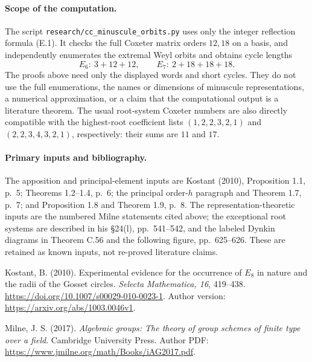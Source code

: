 \paragraph{Scope of the computation.}
The script \texttt{research/cc\_minuscule\_orbits.py} uses only
the integer reflection formula (E.1). It checks the full Coxeter
matrix orders \(12,18\) on a basis, and independently enumerates
the extremal Weyl orbits and obtains cycle lengths
\[
                  E_6:\ 3+12+12,\qquad
                  E_7:\ 2+18+18+18.
\]
The proofs above need only the displayed words and short cycles.
They do not use the full enumerations, the names or dimensions
of minuscule representations, a numerical approximation, or a
claim that the computational output is a literature theorem.
The usual root-system Coxeter numbers are also directly compatible
with the highest-root coefficient lists
\((1,2,2,3,2,1)\) and \((2,2,3,4,3,2,1)\), respectively:
their sums are \(11\) and \(17\).

\paragraph{Primary inputs and bibliography.}
The apposition and principal-element inputs are Kostant (2010),
Proposition 1.1, p.~5; Theorems 1.2--1.4, p.~6; the principal
order-\(h\) paragraph and Theorem 1.7, p.~7; and
Proposition 1.8 and Theorem 1.9, p.~8.
The representation-theoretic inputs are the numbered Milne
statements cited above; the exceptional root systems are described
in his \S24(l), pp.~541--542, and the labeled Dynkin diagrams in
Theorem C.56 and the following figure, pp.~625--626. These are retained as known
inputs, not re-proved literature claims.

Kostant, B. (2010). Experimental evidence for the occurrence of
\(E_8\) in nature and the radii of the Gosset circles.
\emph{Selecta Mathematica, 16}, 419--438.
\url{https://doi.org/10.1007/s00029-010-0023-1}.
Author version:
\url{https://arxiv.org/abs/1003.0046v1}.

Milne, J. S. (2017). \emph{Algebraic groups: The theory of group
schemes of finite type over a field}. Cambridge University Press.
Author PDF: \url{https://www.jmilne.org/math/Books/iAG2017.pdf}.
